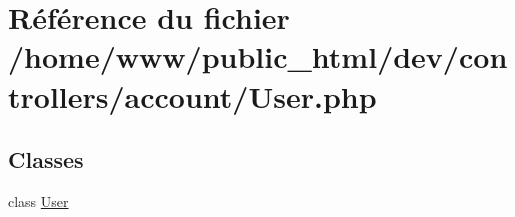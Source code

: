 \hypertarget{_user_8php}{\section{Référence du fichier /home/www/public\-\_\-html/dev/controllers/account/\-User.php}
\label{_user_8php}
}
\subsection*{Classes}
\begin{DoxyCompactItemize}
\item 
class \hyperlink{class_user}{User}
\end{DoxyCompactItemize}
